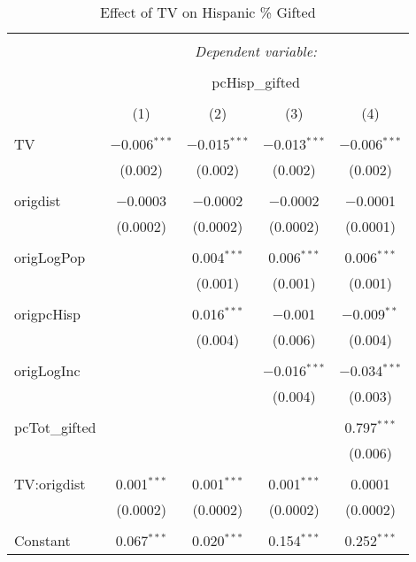 
\begin{table}[!htbp] \centering 
  \caption{Effect of TV on Hispanic \% Gifted} 
  \label{} 
\begin{tabular}{@{\extracolsep{5pt}}lcccc} 
\\[-1.8ex]\hline 
\hline \\[-1.8ex] 
 & \multicolumn{4}{c}{\textit{Dependent variable:}} \\ 
\cline{2-5} 
\\[-1.8ex] & \multicolumn{4}{c}{pcHisp\_gifted} \\ 
\\[-1.8ex] & (1) & (2) & (3) & (4)\\ 
\hline \\[-1.8ex] 
 TV & $-$0.006$^{***}$ & $-$0.015$^{***}$ & $-$0.013$^{***}$ & $-$0.006$^{***}$ \\ 
  & (0.002) & (0.002) & (0.002) & (0.002) \\ 
  & & & & \\ 
 origdist & $-$0.0003 & $-$0.0002 & $-$0.0002 & $-$0.0001 \\ 
  & (0.0002) & (0.0002) & (0.0002) & (0.0001) \\ 
  & & & & \\ 
 origLogPop &  & 0.004$^{***}$ & 0.006$^{***}$ & 0.006$^{***}$ \\ 
  &  & (0.001) & (0.001) & (0.001) \\ 
  & & & & \\ 
 origpcHisp &  & 0.016$^{***}$ & $-$0.001 & $-$0.009$^{**}$ \\ 
  &  & (0.004) & (0.006) & (0.004) \\ 
  & & & & \\ 
 origLogInc &  &  & $-$0.016$^{***}$ & $-$0.034$^{***}$ \\ 
  &  &  & (0.004) & (0.003) \\ 
  & & & & \\ 
 pcTot\_gifted &  &  &  & 0.797$^{***}$ \\ 
  &  &  &  & (0.006) \\ 
  & & & & \\ 
 TV:origdist & 0.001$^{***}$ & 0.001$^{***}$ & 0.001$^{***}$ & 0.0001 \\ 
  & (0.0002) & (0.0002) & (0.0002) & (0.0002) \\ 
  & & & & \\ 
 Constant & 0.067$^{***}$ & 0.020$^{***}$ & 0.154$^{***}$ & 0.252$^{***}$ \\ 

\end{tabular}
\end{table}
